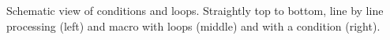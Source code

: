 \label{fig_scriptscheme} Schematic view of conditions and loops. Straightly top to bottom, line by line processing (left) and macro with loops (middle) and with a condition (right).